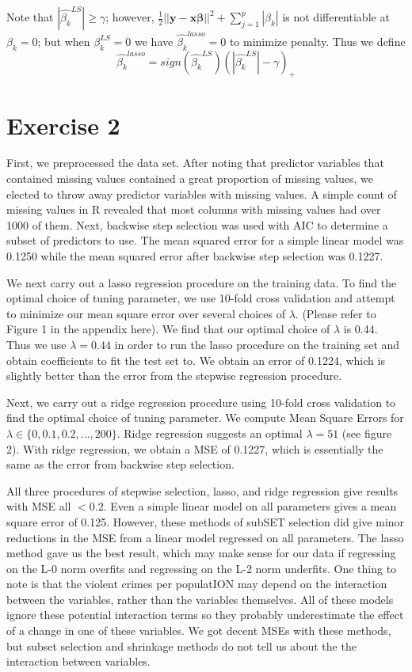 \documentclass[a4paper,10pt]{article}
\begin{document}
    Note that $|\hat{\beta_k}^{LS}| \geq \gamma$; however, $\frac{1}{2}||\mathbf{y}-\mathbf{x\beta}||^2 + \sum_{j=1}^p |\beta_k|$ is not differentiable
    at $\beta_k=0$; but when $\beta_k^{LS}=0$ we have $\hat{\beta_k}^{lasso}=0$ to minimize penalty. Thus we define
      $$\hat{\beta_k}^{lasso} = sign\left(\hat{\beta_k}^{LS}\right)\left(|\hat{\beta_k}^{LS}|-\gamma\right)_+$$
\section{Exercise 2}

First, we preprocessed the data set. After noting that predictor variables that contained missing values contained a great proportion of missing values, we
elected to throw away predictor variables with missing values. A simple count of missing values in R revealed that most columns with missing values had over 1000
of them. Next, backwise step selection was used with AIC to determine a subset of predictors to use. The mean squared error for a simple linear model was
0.1250 while the mean squared error after backwise step selection was 0.1227.

We next carry out a lasso regression procedure on the training data. To find the optimal choice of tuning parameter, we use 10-fold cross validation
and attempt to minimize our mean square error over several choices of $\lambda$. (Please refer to Figure 1 in the appendix here). We find that our optimal 
choice of $\lambda$ is 0.44. Thus we use $\lambda=0.44$ in order to run the lasso procedure on the training set and obtain coefficients to fit the test set to.
We obtain an error of 0.1224, which is slightly better than the error from the stepwise regression procedure.

Next, we carry out a ridge regression procedure using 10-fold cross validation to find the optimal choice of tuning parameter. We compute Mean Square Errors for
  $\lambda \in \{0,0.1,0.2,...,200\}$. Ridge regression suggests an optimal $\lambda=51$ (see figure 2). With ridge regression, we obtain a MSE of 0.1227, which
  is essentially the same as the error from backwise step selection.

All three procedures of stepwise selection, lasso, and ridge regression give results with MSE all $< 0.2$. Even a simple linear model on all parameters gives
a mean square error of 0.125. However, these methods of subSET selection did give minor reductions in the MSE from a linear model regressed on all parameters. The lasso
method gave us the best result, which may make sense for our data if regressing on the L-0 norm overfits and regressing on the L-2 norm underfits.
One thing to note is that the violent crimes per populatION may depend on the interaction between the variables, rather than the variables themselves. All of
these models ignore these potential interaction terms so they probably underestimate the effect of a change in one of these variables. We got decent MSEs with
these methods, but subset selection and shrinkage methods do not tell us about the the interaction between variables.
\end{document}
